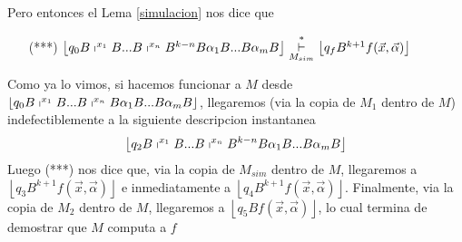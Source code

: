 \begin{frame}
  \begin{block}{}
    \PN Pero entonces el Lema \ref{simulacion} nos dice que

    \begin{enumerate}
    \item[(***)] $\left\lfloor q_{0}B\shortmid ^{x_{1}}B...B\shortmid
    ^{x_{n}}B^{k-n}B\alpha _{1}B...B\alpha _{m}B\right\rfloor \overset{\ast }{%
    \underset{M_{sim}}{\vdash }}\left\lfloor q_{f}B^{k+1}f(\vec{x},\vec{\alpha}%
    )\right\rfloor $
    \end{enumerate}

    Como ya lo vimos, si hacemos funcionar a $M$ desde $\left\lfloor
    q_{0}B\shortmid ^{x_{1}}B...B\shortmid ^{x_{n}}B\alpha _{1}B...B\alpha
    _{m}B\right\rfloor $, llegaremos (via la copia de $M_{1}$ dentro de $M$)
    indefectiblemente a la siguiente descripcion instantanea%
    \begin{equation*}
    \left\lfloor q_{2}B\shortmid ^{x_{1}}B...B\shortmid ^{x_{n}}B^{k-n}B\alpha
    _{1}B...B\alpha _{m}B\right\rfloor
    \end{equation*}%
    Luego (***) nos dice que, via la copia de $M_{sim}$ dentro de $M$,
    llegaremos a $\left\lfloor q_{3}B^{k+1}f(\vec{x},\vec{\alpha})\right\rfloor $
    e inmediatamente a $\left\lfloor q_{4}B^{k+1}f(\vec{x},\vec{\alpha}%
    )\right\rfloor $. Finalmente, via la copia de $M_{2}$ dentro de $M$,
    llegaremos a $\left\lfloor q_{5}Bf(\vec{x},\vec{\alpha})\right\rfloor $, lo
    cual termina de demostrar que $M$ computa a $f$
  \end{block}
\end{frame}
